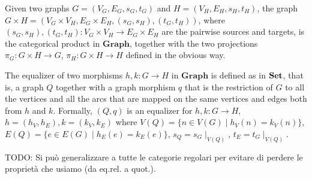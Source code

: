 \begin{example}
    Given two graphs $G = (V_G, E_G, s_G, t_G)$ and $H=(V_H, E_H, s_H, t_H)$, the graph $G \times H = (V_G\times V_H, E_G \times E_H, (s_G, s_H), (t_G, t_H))$, where $(s_G, s_H), (t_G, t_H):V_G\times V_H \rightarrow E_G \times E_H$ are the pairwise sources and targets, is the categorical product in $\mathbf{Graph}$, together with the two projections $\pi_G: G \times H \rightarrow G$, $\pi_H : G \times H \rightarrow H$ defined in the obvious way.
\end{example}

\begin{example}
    The equalizer of two morphisms $h, k: G \rightarrow H$ in $\mathbf{Graph}$ is defined as in $\mathbf{Set}$, that is,  a graph $Q$ together with a graph morphism $q$ that is the restriction of $G$ to all the vertices and all the arcs that are mapped on the same vertices and edges both from $h$ and $k$. Formally, $(Q, q)$ is an equalizer for $h, k: G \rightarrow H$, $h = (h_V, h_E), k = (k_V, k_E)$ where $V(Q) = \{ n \in V(G) \mid h_V(n) = k_V(n)\}$, $E(Q) = \{ e \in E(G) \mid h_E(e) = k_E(e)\}$, $s_Q = s_G \mid_{V(Q)}$, $t_E = t_G \mid_{V(Q)}$.
\end{example}

\begin{remark}
    TODO: Si può generalizzare a tutte le categorie regolari per evitare di perdere le proprietà che usiamo (da eq.rel. a quot.).
\end{remark}